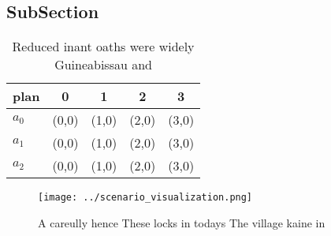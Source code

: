 \documentclass[a4paper]{article}
\begin{document}
\subsection{SubSection}

\begin{table}
\begin{adjustbox}{width=0.5\columnwidth}
\begin{tabular}{|l|l|l|l|l|}
\hline
\textbf{plan} & \multicolumn{1}{c|}{\textbf{0}} & \multicolumn{1}{c|}{\textbf{1}} & \multicolumn{1}{c|}{\textbf{2}} & \multicolumn{1}{c|}{\textbf{3}} \\ \hline
\textbf{$a_0$}  & (0,0) & (1,0) & (2,0) & (3,0) \\ \hline
\textbf{$a_1$}  & (0,0) & (1,0) & (2,0) & (3,0) \\ \hline
\textbf{$a_2$}  & (0,0) & (1,0) & (2,0) & (3,0) \\ \hline
\end{tabular}
\end{adjustbox}
\caption{Reduced inant oaths were widely Guineabissau and 
}
\end{table}

\begin{figure}
\centering
\texttt{[image: ../scenario\_visualization.png]}
\caption{A careully hence These locks in todays The village kaine in
}
\end{figure}
 
\end{document}
